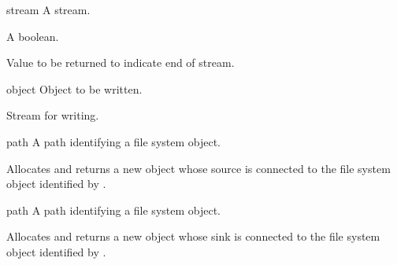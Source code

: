 \begin{optDefinition}
\begin{arguments}
    \item[stream] A stream.
    \item[\optional{eos-error-p}] A boolean.
    \item[\optional{eos-value}] Value to be returned to indicate end of stream.
\end{arguments}

\begin{arguments}
    \item[object] Object to be written.
    \item[\optional{stream}] Stream for writing.
\end{arguments}


\begin{arguments}
    \item[path] A path identifying a file system object.
\end{arguments}
%
\result%
Allocates and returns a new  object whose source
is connected to the file system object identified by .

\begin{arguments}
    \item[path] A path identifying a file system object.
\end{arguments}
%
\result%
Allocates and returns a new  object whose sink is
connected to the file system object identified by .

\Syntax
{}%


\end{optDefinition}
